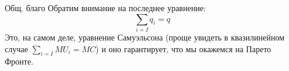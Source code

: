 \documentclass{beamer}
\begin{document}
\begin{frame}{Общ. благо}
Обратим внимание на последнее уравнение:
$$\sum_{i=I} q_i = q$$
Это, на самом деле, уравнение Самуэльсона (проще увидеть в квазилинейном случае $\sum_{i = I} MU_i = MC$) и оно гарантирует, что мы окажемся на Парето Фронте.

\end{frame}

%
%
%
%
%
%
%
%
\end{document}
